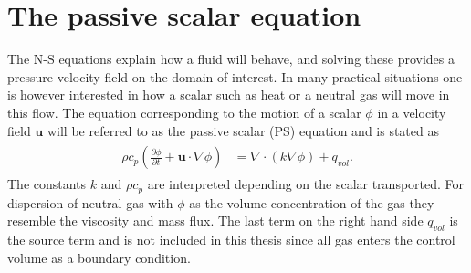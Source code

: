 


\section{The passive scalar equation}
The N-S equations explain how a fluid will behave, and solving these provides a pressure-velocity field on the 
domain of interest. 
In many practical situations one is however interested in how a scalar such as heat or a neutral gas will move in this flow.
The equation corresponding to the motion of a scalar $\phi$ in a velocity field $\mathbf{u}$
will be referred to as the passive scalar (PS) equation and is stated as 
\begin{align}
    \begin{split}
        \rho c_p(\frac{\partial \phi}{\partial t} + \mathbf{u}\cdot \nabla\phi) 
        &= \nabla \cdot(k\nabla \phi)+ q_{vol}. 
    \end{split}
	\label{eq:PS}
\end{align}
The constants $k$ and $\rho c_p$ are interpreted depending on 
the scalar transported. For dispersion of neutral gas with $\phi$ as the volume concentration of the gas
they resemble the viscosity and mass flux. The last term on the right hand side $q_{vol}$ is the source term and is not 
included in this thesis since all gas enters the control volume as a boundary condition.

